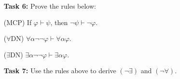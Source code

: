 \documentclass[a4paper, 11pt]{article} %
\newcommand{\qt}[2]{#1 #2} %
\newcommand{\unisub}[2]{[#1/#2]}
\begin{document}
\begin{enumerate}
  \item[\bf Task 6:] Prove the rules below: 
  \item[(MCP)] If $\varphi\vdash\psi$, then $\neg\psi\vdash\neg\varphi$.
  \item[($\forall$DN)] $\forall\alpha\neg\neg\varphi\vdash\forall\alpha\varphi$.
  \item[($\exists$DN)] $\exists\alpha\neg\neg\varphi\vdash\exists\alpha\varphi$.
  \item[\bf Task 7:] Use the rules above to derive $(\neg\exists)$ and $(\neg\forall)$.
\end{enumerate}
\end{document}
